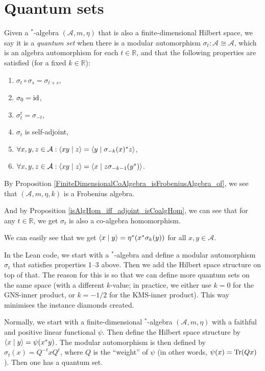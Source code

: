 \chapter{Quantum sets}

 \begin{definition}\label{QuantumSet}
  \leanok
  Given a $^*$-algebra $(\mathcal{A},m,\eta)$ that is also a finite-dimensional Hilbert space,
  we say it is a \textit{quantum set} when there is a modular automorphism $\sigma_t\colon\mathcal{A}\cong\mathcal{A}$, which is an algebra automorphism for each $t\in\mathbb{R}$, and that the following properties are satisfied (for a fixed $k\in\mathbb{R}$):
  \begin{enumerate}
   \item $\sigma_t\circ\sigma_s=\sigma_{t+s}$,
   \item $\sigma_0=\operatorname{id}$,
   \item $\sigma_t^{\operatorname{r}}=\sigma_{-t}$,
   \item $\sigma_t$ is self-adjoint,
   \item $\forall{x,y,z}\in\mathcal{A}:\left\langle xy \mid z\right\rangle=\left\langle y \mid \sigma_{-k}(x)^*z\right\rangle$,
   \item $\forall{x,y,z}\in\mathcal{A}:\left\langle xy \mid z\right\rangle=\left\langle x \mid z\sigma_{-k-1}(y^*)\right\rangle$.
  \end{enumerate}
  By Proposition \ref{FiniteDimensionalCoAlgebra_isFrobeniusAlgebra_of}, we see that $(\mathcal{A},m,\eta,k)$ is a Frobenius algebra.

  And by Proposition \ref{isAlgHom_iff_adjoint_isCoalgHom}, we can see that for any $t\in\mathbb{R}$, we get $\sigma_t$ is also a co-algebra homomorphism.

  We can easily see that we get $\left\langle x \mid y\right\rangle=\eta^*(x^*\sigma_k(y))$ for all $x,y\in\mathcal{A}$.
 \end{definition}
 \begin{remark}
  In the Lean code, we start with a $^*$-algebra and define a modular automorphism $\sigma_t$ that satisfies properties 1--3 above.
  Then we add the Hilbert space structure on top of that.
  The reason for this is so that we can define more quantum sets on the same space (with a different $k$-value; in practice, we either use $k=0$ for the GNS-inner product, or $k=-1/2$ for the KMS-inner product).
  This way minimises the instance diamonds created.

  Normally, we start with a finite-dimensional $^*$-algebra $(\mathcal{A},m,\eta)$ with a faithful and positive linear functional $\psi$. Then define the Hilbert space structure by $\left\langle x \mid y\right\rangle=\psi(x^*y)$.
  The modular automorphism is then defined by $\sigma_t(x)=Q^{-t}xQ^t$, where $Q$ is the ``weight'' of $\psi$ (in other words, $\psi(x)=\operatorname{Tr}(Q x)$).
  Then one has a quantum set.
 \end{remark}

